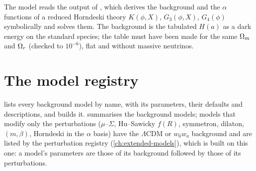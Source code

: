 The model  reads the output of , which
derives the background and the $\alpha$ functions of a reduced Horndeski theory $K(\phi,X)$, $G_3(\phi,X)$,
$G_4(\phi)$ \cite{Horndeski1974,Bellini2014} symbolically and solves them. The background is the tabulated $H(a)$ as a
dark energy on the standard species; the table must have been made for the same $\Omega_m$ and $\Omega_r$ (checked to
$10^{-6}$), flat and without massive neutrinos.

\section{The model registry}\label{sec:bg-registry}

 lists every background model by name, with its parameters, their defaults and descriptions, and
 builds it.  summarises the background
models; models that modify only the perturbations ($\mu$--$\Sigma$, Hu--Sawicky $f(R)$, symmetron, dilaton,
$(m,\beta)$, Horndeski in the $\alpha$ basis) have the $\Lambda$CDM or $w_0w_a$ background and are listed by the
perturbation registry (\cref{ch:extended-models}), which is built on this one: a model's parameters are those of its
background followed by those of its perturbations.

